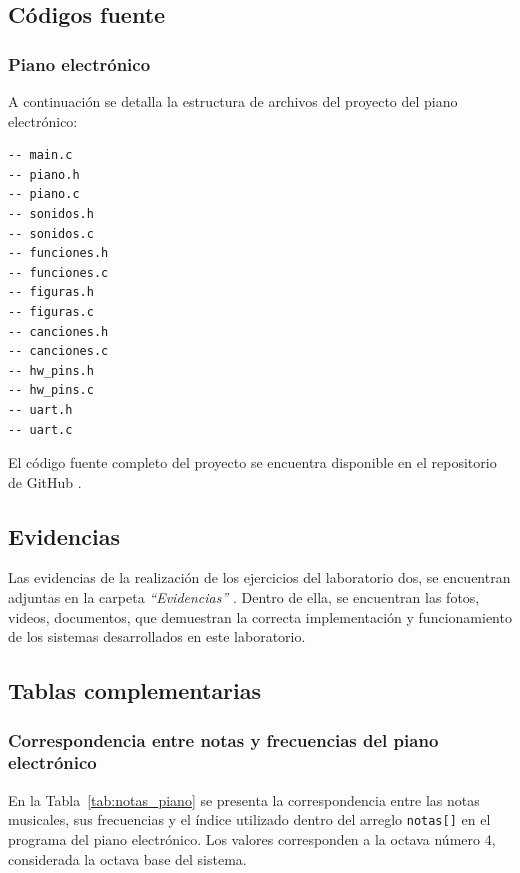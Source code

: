 \subsection{Códigos fuente}

\subsubsection{Piano electrónico}
A continuación se detalla la estructura de archivos del proyecto del piano electrónico:

\begin{verbatim}
-- main.c
-- piano.h
-- piano.c
-- sonidos.h
-- sonidos.c
-- funciones.h
-- funciones.c
-- figuras.h
-- figuras.c
-- canciones.h
-- canciones.c
-- hw_pins.h
-- hw_pins.c
-- uart.h
-- uart.c

\end{verbatim}

El código fuente completo del proyecto se encuentra disponible en el repositorio de GitHub \cite{utec_tecmicro}.

\subsection{Evidencias}
Las evidencias de la realización de los ejercicios del laboratorio dos, se encuentran adjuntas en la carpeta \textit{“Evidencias”} \cite{github_evidencias_lab2}. Dentro de ella, se encuentran las fotos, videos, documentos, que demuestran la correcta implementación y funcionamiento de los sistemas desarrollados en este laboratorio.

\subsection{Tablas complementarias}
\subsubsection{Correspondencia entre notas y frecuencias del piano electrónico}

En la Tabla~\ref{tab:notas_piano} se presenta la correspondencia entre las notas musicales, 
sus frecuencias y el índice utilizado dentro del arreglo \texttt{notas[]} en el programa del piano electrónico. 
Los valores corresponden a la octava número 4, considerada la octava base del sistema. 

